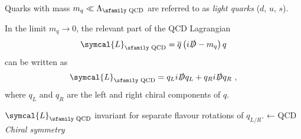 \documentclass[professionalfonts,aspectratio=169]{beamer}
\newcommand{\adj}[1]{\overline{#1}}
\begin{document}

\begin{frame}
  Quarks with mass $m_q \ll \Lambda_\text{\sfamily QCD}$ are 
  referred to as \emph{light quarks} ($d$, $u$, $s$).
  
  \pause
  In the limit $m_q \to 0$, the relevant part of the QCD Lagrangian
  \begin{equation*}
    \symcal{L}_\text{\sfamily QCD} = \adj{q} \left( i \slashed{D} - m_q \right) q
  \end{equation*}
  can be written as 
  \begin{equation*}
    \symcal{L}_\text{\sfamily QCD} = q_{L} i \slashed{D} q_{L} + q_{R} i \slashed{D} q_{R} \ ,
  \end{equation*}
  where $q_{L}$ and $q_{R}$ are the left and right chiral components of $q$.

  \pause
  $\symcal{L}_\text{\sfamily QCD}$ invariant for separate flavour rotations of $q_{L/R}$. ← \alert{QCD \emph{Chiral symmetry}}
\end{frame}
\end{document}
